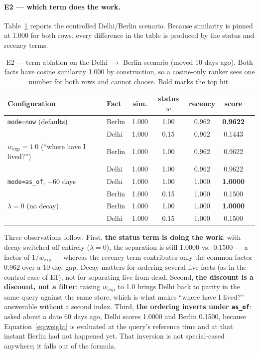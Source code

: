 \documentclass[11pt,a4paper]{article}
\begin{document}
\paragraph{E2 --- which term does the work.} Table~\ref{tab:e2} reports the
controlled Delhi/Berlin scenario. Because similarity is pinned at 1.000 for both
rows, every difference in the table is produced by the status and recency terms.

\begin{table}[htbp]
\centering
\caption{E2 --- term ablation on the Delhi $\to$ Berlin scenario (moved 10 days
ago). Both facts have cosine similarity 1.000 by construction, so a cosine-only
ranker sees one number for both rows and cannot choose. Bold marks the top hit.}
\label{tab:e2}
\small
\begin{tabular}{llccccl}
\toprule
\textbf{Configuration} & \textbf{Fact} & \textbf{sim.} & \textbf{status $w$} & \textbf{recency} & \textbf{score} & \\
\midrule
\texttt{mode=now} (defaults) & Berlin & 1.000 & 1.00 & 0.962 & \textbf{0.9622} & \\
                             & Delhi  & 1.000 & 0.15 & 0.962 & 0.1443 & \\
\addlinespace
$w_{\text{exp}}=1.0$ (``where have I lived?'') & Berlin & 1.000 & 1.00 & 0.962 & 0.9622 & \\
                             & Delhi  & 1.000 & 1.00 & 0.962 & 0.9622 & \\
\addlinespace
\texttt{mode=as\_of}, $-60$ days & Delhi  & 1.000 & 1.00 & 1.000 & \textbf{1.0000} & \\
                             & Berlin & 1.000 & 0.15 & 1.000 & 0.1500 & \\
\addlinespace
$\lambda = 0$ (no decay) & Berlin & 1.000 & 1.00 & 1.000 & \textbf{1.0000} & \\
                             & Delhi  & 1.000 & 0.15 & 1.000 & 0.1500 & \\
\bottomrule
\end{tabular}
\end{table}

Three observations follow. First, \textbf{the status term is doing the work}:
with decay switched off entirely ($\lambda = 0$), the separation is still
$1.0000$ vs.\ $0.1500$ --- a factor of $1/w_{\text{exp}}$ --- whereas the
recency term contributes only the common factor $0.962$ over a 10-day gap. Decay
matters for ordering several live facts (as in the control case of E1), not for
separating live from dead. Second, \textbf{the discount is a discount, not a
filter}: raising $w_{\text{exp}}$ to 1.0 brings Delhi back to parity in the same
query against the same store, which is what makes ``where have I lived?''
answerable without a second index. Third, \textbf{the ordering inverts under
\texttt{as\_of}}: asked about a date 60 days ago, Delhi scores 1.0000 and Berlin
0.1500, because Equation~\eqref{eq:weight} is evaluated at the query's reference
time and at that instant Berlin had not happened yet. That inversion is not
special-cased anywhere; it falls out of the formula.
\end{document}
